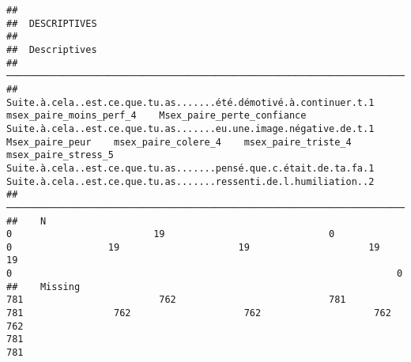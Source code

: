 \documentclass[
]{article}
\begin{document}
\begin{verbatim}
## 
##  DESCRIPTIVES
## 
##  Descriptives                                                                                                                                                                                                                                                                                                                                                                                                                                     
##  ──────────────────────────────────────────────────────────────────────────────────────────────────────────────────────────────────────────────────────────────────────────────────────────────────────────────────────────────────────────────────────────────────────────────────────────────────────────────────────────────────────────────────────────────────────────────────────────────────────────────────────────────────────────────── 
##               Suite.à.cela..est.ce.que.tu.as.......été.démotivé.à.continuer.t.1    msex_paire_moins_perf_4    Msex_paire_perte_confiance    Suite.à.cela..est.ce.que.tu.as.......eu.une.image.négative.de.t.1    Msex_paire_peur    msex_paire_colere_4    msex_paire_triste_4    msex_paire_stress_5    Suite.à.cela..est.ce.que.tu.as.......pensé.que.c.était.de.ta.fa.1    Suite.à.cela..est.ce.que.tu.as.......ressenti.de.l.humiliation..2   
##  ──────────────────────────────────────────────────────────────────────────────────────────────────────────────────────────────────────────────────────────────────────────────────────────────────────────────────────────────────────────────────────────────────────────────────────────────────────────────────────────────────────────────────────────────────────────────────────────────────────────────────────────────────────────────── 
##    N                                                                          0                         19                             0                                                                    0                 19                     19                     19                     19                                                                    0                                                                    0   
##    Missing                                                                  781                        762                           781                                                                  781                762                    762                    762                    762                                                                  781                                                                  781   

\end{verbatim}
\end{document}
